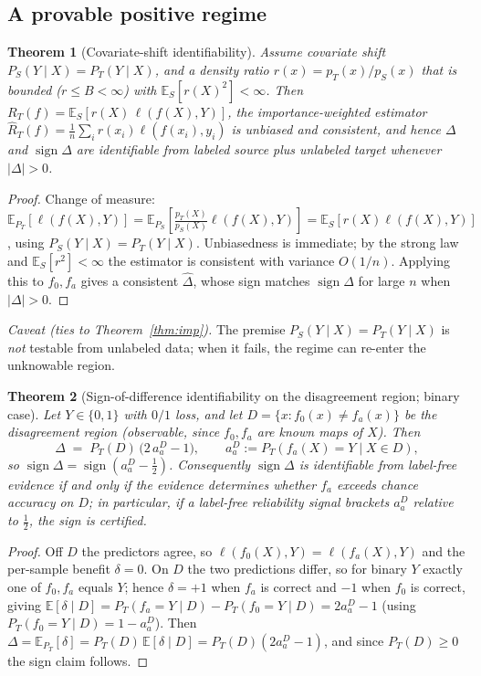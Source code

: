 \documentclass[11pt]{article}
\theoremstyle{plain}
\newtheorem{theorem}{Theorem}
\theoremstyle{definition}
\newcommand{\E}{\mathbb{E}}
\newcommand{\sign}{\operatorname{sign}}
\begin{document}
\subsection{A provable positive regime}\label{sec:pos}
\begin{theorem}[Covariate-shift identifiability]\label{thm:pos}
Assume covariate shift $P_S(Y\mid X)=P_T(Y\mid X)$, and a density ratio
$r(x)=p_T(x)/p_S(x)$ that is bounded ($r\le B<\infty$) with $\E_S[r(X)^2]<\infty$.
Then $R_T(f)=\E_S[r(X)\,\ell(f(X),Y)]$, the importance-weighted estimator
$\widehat R_T(f)=\tfrac1n\sum_i r(x_i)\ell(f(x_i),y_i)$ is unbiased and consistent, and
hence $\Delta$ and $\sign\Delta$ are identifiable from labeled source plus unlabeled
target whenever $|\Delta|>0$.
\end{theorem}
\begin{proof}
Change of measure: $\E_{P_T}[\ell(f(X),Y)]=\E_{P_S}[\tfrac{p_T(X)}{p_S(X)}\ell(f(X),Y)]
=\E_S[r(X)\ell(f(X),Y)]$, using $P_S(Y\mid X)=P_T(Y\mid X)$. Unbiasedness is immediate;
by the strong law and $\E_S[r^2]<\infty$ the estimator is consistent with variance
$O(1/n)$. Applying this to $f_0,f_a$ gives a consistent $\widehat\Delta$, whose sign
matches $\sign\Delta$ for large $n$ when $|\Delta|>0$. \qedhere
\end{proof}
\noindent\emph{Caveat (ties to Theorem~\ref{thm:imp}).} The premise
$P_S(Y\mid X)=P_T(Y\mid X)$ is \emph{not} testable from unlabeled data; when it fails,
the regime can re-enter the unknowable region.
\begin{theorem}[Sign-of-difference identifiability on the disagreement region; binary case]\label{thm:disagree}
Let $Y\in\{0,1\}$ with $0/1$ loss, and let $D=\{x: f_0(x)\neq f_a(x)\}$ be the
\emph{disagreement region} (observable, since $f_0,f_a$ are known maps of $X$). Then
\[
\Delta \;=\; P_T(D)\,\bigl(2\,a_a^D-1\bigr),\qquad a_a^D:=P_T\!\left(f_a(X)=Y \mid X\in D\right),
\]
so $\sign\Delta=\sign\!\left(a_a^D-\tfrac12\right)$. Consequently $\sign\Delta$ is
identifiable from label-free evidence \emph{if and only if} the evidence determines
whether $f_a$ exceeds chance accuracy on $D$; in particular, if a label-free
reliability signal brackets $a_a^D$ relative to $\tfrac12$, the sign is certified.
\end{theorem}
\begin{proof}
Off $D$ the predictors agree, so $\ell(f_0(X),Y)=\ell(f_a(X),Y)$ and the per-sample
benefit $\delta=0$. On $D$ the two predictions differ, so for binary $Y$ exactly one
of $f_0,f_a$ equals $Y$; hence $\delta=+1$ when $f_a$ is correct and $-1$ when $f_0$
is correct, giving $\E[\delta\mid D]=P_T(f_a{=}Y\mid D)-P_T(f_0{=}Y\mid D)=2a_a^D-1$
(using $P_T(f_0{=}Y\mid D)=1-a_a^D$). Then
$\Delta=\E_{P_T}[\delta]=P_T(D)\,\E[\delta\mid D]=P_T(D)(2a_a^D-1)$, and since
$P_T(D)\ge0$ the sign claim follows. \qedhere
\end{proof}
\end{document}
